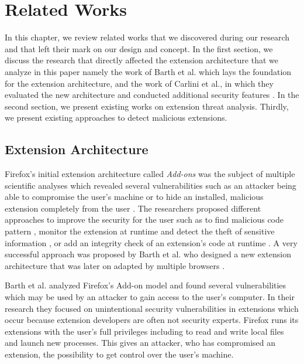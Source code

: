
\chapter{Related Works}
\label{chp:relatedWorks}

	In this chapter, we review related works that we discovered during our research and that left their mark on our design and concept. In the first section, we discuss the research that directly affected the extension architecture that we analyze in this paper namely the work of Barth et al. which lays the foundation for the extension architecture, and the work of Carlini et al., in which they evaluated the new architecture and conducted additional security features \cite{Barth10protectingbrowsers, Carlini:2012:EGC:2362793.2362800}. In the second section, we present existing works on extension threat analysis. Thirdly, we present existing approaches to detect malicious extensions.

\section{Extension Architecture}
\label{sec:relatedWorks:extensionArchitecture}

	Firefox's initial extension architecture called \textit{Add-ons} was the subject of multiple scientific analyses which revealed several vulnerabilities such as an attacker being able to compromise the user's machine or to hide an installed, malicious extension completely from the user \cite{Bandhakavi:2011:VBE:1995376.1995398, TerLouw:2007:EWB:1420581.1420583}. The researchers proposed different approaches to improve the security for the user such as to find malicious code pattern \cite{Bandhakavi:2011:VBE:1995376.1995398}, monitor the extension at runtime and detect the theft of sensitive information \cite{Dhawan:2009:AIF:1723192.1723250, cs2015sentinel, TerLouw:2007:EWB:1420581.1420583}, or add an integrity check of an extension's code at runtime \cite{TerLouw:2007:EWB:1420581.1420583}. A very successful approach was proposed by Barth et al. who designed a new extension architecture that was later on adapted by multiple browsers \cite{Barth10protectingbrowsers}. 
	
	Barth et al. analyzed Firefox's Add-on model and found several vulnerabilities which may be used by an attacker to gain access to the user's computer. In their research they focused on unintentional security vulnerabilities in extensions which occur because extension developers are often not security experts. Firefox runs its extensions with the user's full privileges including to read and write local files and launch new processes. This gives an attacker, who has compromised an extension, the possibility to get control over the user's machine. 
	
